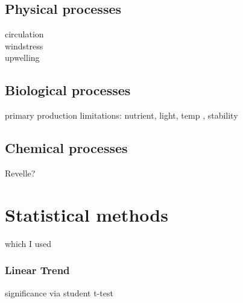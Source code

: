 \subsection{Physical processes}
circulation \\
windstress \\
upwelling \\

\subsection{Biological processes}
primary production \citep{Six1996}
limitations: nutrient, light, temp \citep{Eppley1972}, stability \citep{Sverdrup1953}

\subsection{Chemical processes}
Revelle?

\section{Statistical methods}
which I used
\subsubsection*{Linear Trend}
significance via student t-test
